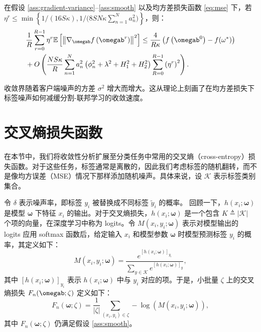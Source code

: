 \begin{theorem}[均方差损失下的收敛性]\label{theorem-nonconvex}
在假设 \ref{ass:gradient-variance}--\ref{ass:smooth} 以及均方差损失函数 \eqref{eq:mse} 下，若 $\eta^r \leq \min\left\{ {1}/{(16S\kappa)},  {1}/{(8SN\kappa\sum_{n=1}^Na_n^2})\right\}$，则：
\begin{equation}\label{bound-v2-nc-full}
\begin{aligned}
&\frac{1}{R}\sum_{r=0}^{R-1}\eta^r\mathbb{E}\left[\left\Vert
\nabla_{\omegab}f\left(\omegab^{r}\right)\right\Vert^2\right]\leq \frac{4}{R\kappa}\left(f\left(\omegab^{0}\right)-f(\omega^*)\right)\\
&+O\left(\frac{NS\kappa }{R} \sum_{n=1}^Na_n^2\left(\phi_n^2+\lambda^2+H_1^2+H_2^2\right)\sum_{R=0}^{R-1}\left(\eta^r\right)^2\right).
\end{aligned}
\end{equation}
\end{theorem}

收敛界随着客户端噪声的方差 $\sigma^2$ 增大而增大。这从理论上刻画了在均方差损失下标签噪声如何减缓分割-联邦学习的收敛速度。

\section{交叉熵损失函数}
在本节中，我们将收敛性分析扩展至分类任务中常用的交叉熵（cross-entropy）损失函数。对于这些任务，标签通常是离散的，因此我们考虑标签的随机翻转，而不是像均方误差（MSE）情况下那样添加随机噪声。具体来说，设 $\mathcal{K}$ 表示标签类别集合。

令 $\delta$ 表示噪声率，即标签 $y_i$ 被替换成不同标签 $\tilde{y}_i$ 的概率。
回顾一下，$h\left(x_i;\boldsymbol{\omega}\right)$ 是模型 $\boldsymbol{\omega}$ 下特征 $x_i$ 的输出。对于交叉熵损失，$h\left(x_i;\boldsymbol{\omega}\right)$ 是一个包含 $K\triangleq|\mathcal{K}|$ 个项的向量，在深度学习中称为 logits。令 $ M(x_i, {y}_i; \boldsymbol{\omega}) $ 表示对模型输出的 logits 应用 softmax 函数后，给定输入 $x_i$ 和模型参数 $\boldsymbol{\omega}$ 时模型预测标签 $y_i$ 的概率，其定义如下：
\begin{equation}\label{eq:cross}
    M(x_i, {y}_i; \boldsymbol{\omega})= \frac{e^{[h\left(x_i;\boldsymbol{\omega}\right)]_{{y}_i}}}{\sum_{{y}\in\mathcal{K}}e^{[h\left(x_i;\boldsymbol{\omega}\right)]_{{y}}}},
\end{equation}
其中 $[h\left(x_i;\boldsymbol{\omega}\right)]_{{y}_i}$ 表示 $h\left(x_i;\boldsymbol{\omega}\right)$ 中与 ${y}_i$ 对应的项。于是，小批量 $\zeta$ 上的交叉熵损失 $F_{n}(\omegab;\zeta)$ 定义如下：
\begin{equation}\label{eq:cross-entropy}
F_n\left(\boldsymbol{\omega};\zeta\right)=\frac{1}{|\zeta|}\sum_{\left(x_i,y_i\right)\in \zeta}-\log\left(M(x_i, {y}_i; \boldsymbol{\omega})\right),
\end{equation}
其中 $F_n\left(\boldsymbol{\omega};\zeta\right)$ 仍满足假设 \ref{ass:smooth}。

